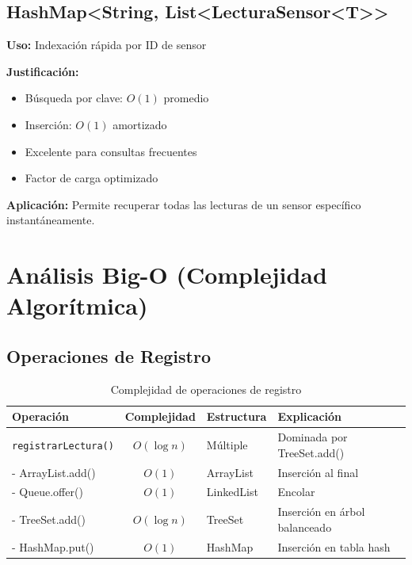 \documentclass[12pt,a4paper]{article}
\begin{document}
\subsection{HashMap<String, List<LecturaSensor<T>>}

\begin{tcolorbox}[colback=blue!5,colframe=blue!75!black,title=Indexación Rápida]
\textbf{Uso:} Indexación rápida por ID de sensor

\textbf{Justificación:}
\begin{itemize}
    \item Búsqueda por clave: $O(1)$ promedio
    \item Inserción: $O(1)$ amortizado
    \item Excelente para consultas frecuentes
    \item Factor de carga optimizado
\end{itemize}

\textbf{Aplicación:} Permite recuperar todas las lecturas de un sensor específico instantáneamente.
\end{tcolorbox}


\section{Análisis Big-O (Complejidad Algorítmica)}

\subsection{Operaciones de Registro}

\begin{table}[h]
\centering
\begin{tabular}{|l|c|l|p{5cm}|}
\hline
\rowcolor{agrogreen!20}
\textbf{Operación} & \textbf{Complejidad} & \textbf{Estructura} & \textbf{Explicación} \\
\hline
\texttt{registrarLectura()} & $O(\log n)$ & Múltiple & Dominada por TreeSet.add() \\
\hline
- ArrayList.add() & $O(1)$ & ArrayList & Inserción al final \\
- Queue.offer() & $O(1)$ & LinkedList & Encolar \\
- TreeSet.add() & $O(\log n)$ & TreeSet & Inserción en árbol balanceado \\
- HashMap.put() & $O(1)$ & HashMap & Inserción en tabla hash \\
\hline
\end{tabular}
\caption{Complejidad de operaciones de registro}
\label{tab:complejidad-registro}
\end{table}
\end{document}
